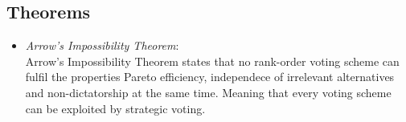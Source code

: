 \documentclass[conference]{IEEEtran}
\begin{document}
\subsection{Theorems}
\begin{itemize}
    \item \textit{Arrow's Impossibility Theorem}\cite{arrow2012social}:\\
    Arrow's Impossibility Theorem states that no rank-order voting scheme can fulfil the properties Pareto efficiency, independece of irrelevant alternatives and non-dictatorship at the same time.
    Meaning that every voting scheme can be exploited by strategic voting.\cite{pitt2006voting}
\end{itemize}


\end{document}
